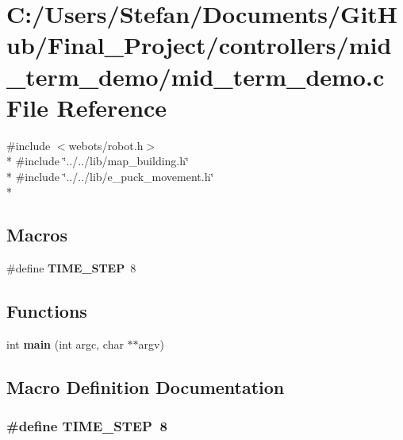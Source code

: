 \section{C\-:/\-Users/\-Stefan/\-Documents/\-Git\-Hub/\-Final\-\_\-\-Project/controllers/mid\-\_\-term\-\_\-demo/mid\-\_\-term\-\_\-demo.c File Reference}
\label{mid__term__demo_8c}
{\ttfamily \#include $<$webots/robot.\-h$>$}\\*
{\ttfamily \#include \char`\"{}../../lib/map\-\_\-building.\-h\char`\"{}}\\*
{\ttfamily \#include \char`\"{}../../lib/e\-\_\-puck\-\_\-movement.\-h\char`\"{}}\\*
\subsection*{Macros}
\begin{DoxyCompactItemize}
\item 
\#define {\bf T\-I\-M\-E\-\_\-\-S\-T\-E\-P}~8
\end{DoxyCompactItemize}
\subsection*{Functions}
\begin{DoxyCompactItemize}
\item 
int {\bf main} (int argc, char $\ast$$\ast$argv)
\end{DoxyCompactItemize}


\subsection{Macro Definition Documentation}
\subsubsection[{T\-I\-M\-E\-\_\-\-S\-T\-E\-P}]{\setlength{\rightskip}{0pt plus 5cm}\#define T\-I\-M\-E\-\_\-\-S\-T\-E\-P~8}\label{mid__term__demo_8c_a65fd90f232757535f02c46a885e49012}


